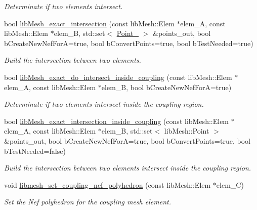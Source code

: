\begin{DoxyCompactItemize}
\begin{DoxyCompactList}\small\item\em Determinate if two elements intersect. \end{DoxyCompactList}\item 
bool \hyperlink{classcarl_1_1_intersection___tools_ad57f9ae9fd2cce1ff7fc2430bf6c6b71}{lib\+Mesh\+\_\+exact\+\_\+intersection} (const lib\+Mesh\+::\+Elem $\ast$elem\+\_\+\+A, const lib\+Mesh\+::\+Elem $\ast$elem\+\_\+\+B, std\+::set$<$ \hyperlink{_c_g_a_l__typedefs_8h_a9dc49a828e77bbd58c1f5db13edde547}{Point\+\_} $>$ \&points\+\_\+out, bool b\+Create\+New\+Nef\+For\+A=true, bool b\+Convert\+Points=true, bool b\+Test\+Needed=true)
\begin{DoxyCompactList}\small\item\em Build the intersection between two elements. \end{DoxyCompactList}\item 
bool \hyperlink{classcarl_1_1_intersection___tools_a98929a97acb94aa77fc8952d80993d88}{lib\+Mesh\+\_\+exact\+\_\+do\+\_\+intersect\+\_\+inside\+\_\+coupling} (const lib\+Mesh\+::\+Elem $\ast$elem\+\_\+\+A, const lib\+Mesh\+::\+Elem $\ast$elem\+\_\+\+B, bool b\+Create\+New\+Nef\+For\+A=true)
\begin{DoxyCompactList}\small\item\em Determinate if two elements intersect inside the coupling region. \end{DoxyCompactList}\item 
bool \hyperlink{classcarl_1_1_intersection___tools_ad5aaf7b9475dcfb6a51ea1c20d22aacd}{lib\+Mesh\+\_\+exact\+\_\+intersection\+\_\+inside\+\_\+coupling} (const lib\+Mesh\+::\+Elem $\ast$elem\+\_\+\+A, const lib\+Mesh\+::\+Elem $\ast$elem\+\_\+\+B, std\+::set$<$ lib\+Mesh\+::\+Point $>$ \&points\+\_\+out, bool b\+Create\+New\+Nef\+For\+A=true, bool b\+Convert\+Points=true, bool b\+Test\+Needed=false)
\begin{DoxyCompactList}\small\item\em Build the intersection between two elements intersect inside the coupling region. \end{DoxyCompactList}\item 
void \hyperlink{classcarl_1_1_intersection___tools_acf2d17e703441bc9e3ed05d98f51ba85}{libmesh\+\_\+set\+\_\+coupling\+\_\+nef\+\_\+polyhedron} (const lib\+Mesh\+::\+Elem $\ast$elem\+\_\+\+C)
\begin{DoxyCompactList}\small\item\em Set the Nef polyhedron for the coupling mesh element. \end{DoxyCompactList}\item 

\end{DoxyCompactItemize}
